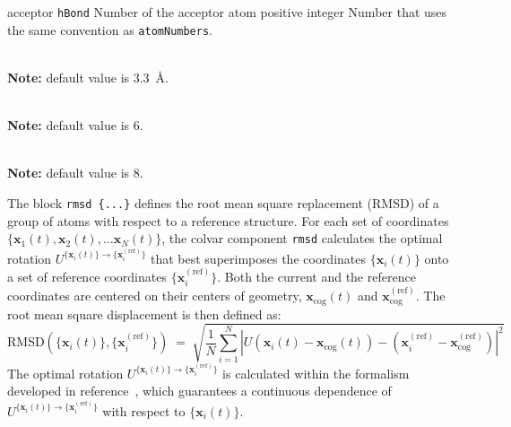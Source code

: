 \begin{cvcoptions}
\item %
  \key
    {acceptor}{%
    \texttt{hBond}}{%
    Number of the acceptor atom}{%
    positive integer}{%
    Number that uses the same convention as \texttt{atomNumbers}.}
\item %
\item %
  \\
  \textbf{Note:} default value is 3.3~\AA.
\item %
  \\
  \textbf{Note:} default value is 6.
\item %
  \\
  \textbf{Note:} default value is 8.
\end{cvcoptions}





The block \texttt{rmsd~\{...\}} defines the root mean square replacement
(RMSD) of a group of atoms with respect to a reference structure.  For
each set of coordinates $\{ \mathbf{x}_1(t), \mathbf{x}_2(t), \ldots
\mathbf{x}_N(t) \}$, the colvar component \texttt{rmsd} calculates the
optimal rotation
$U^{\{\mathbf{x}_{i}(t)\}\rightarrow\{\mathbf{x}_{i}^{\mathrm{(ref)}}\}}$
that best superimposes the coordinates $\{\mathbf{x}_{i}(t)\}$ onto a
set of reference coordinates $\{\mathbf{x}_{i}^{\mathrm{(ref)}}\}$.
Both the current and the reference coordinates are centered on their
centers of geometry, $\mathbf{x}_{\mathrm{cog}}(t)$ and
$\mathbf{x}_{\mathrm{cog}}^{\mathrm{(ref)}}$.  The root mean square
displacement is then defined as:
\begin{equation}
  \label{eq:cvc_rmsd}
  { \mathrm{RMSD}(\{\mathbf{x}_{i}(t)\},
    \{\mathbf{x}_{i}^{\mathrm{(ref)}}\}) } \; = \; \sqrt{
    \frac{1}{N} \sum_{i=1}^{N} \left|
      U
      \left(\mathbf{x}_{i}(t) - \mathbf{x}_{\mathrm{cog}}(t)\right) -
      \left(\mathbf{x}_{i}^{\mathrm{(ref)}} -
        \mathbf{x}_{\mathrm{cog}}^{\mathrm{(ref)}} \right) \right|^{2} }
\end{equation}
The optimal rotation
$U^{\{\mathbf{x}_{i}(t)\}\rightarrow\{\mathbf{x}_{i}^{\mathrm{(ref)}}\}}$
is calculated within the formalism developed in
reference~\cite{Coutsias2004}, which guarantees a continuous
dependence of
$U^{\{\mathbf{x}_{i}(t)\}\rightarrow\{\mathbf{x}_{i}^{\mathrm{(ref)}}\}}$
with respect to $\{\mathbf{x}_{i}(t)\}$.

